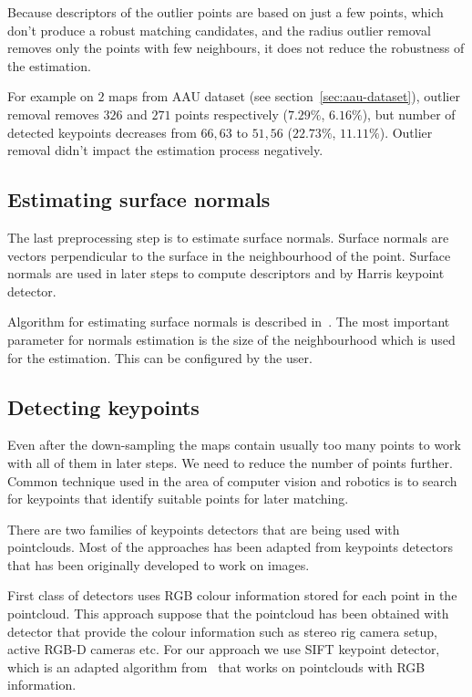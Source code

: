 Because descriptors of the outlier points are based on just a few points, which don't produce a robust matching candidates, and the radius outlier removal removes only the points with few neighbours, it does not reduce the robustness of the estimation.

For example on $2$ maps from \gls{AAU} dataset (see section~\ref{sec:aau-dataset}), outlier removal removes $326$ and $271$ points respectively ($7.29\%$, $6.16\%$), but number of detected keypoints decreases from $66, 63$ to $51, 56$ ($22.73\%$, $11.11\%$). Outlier removal didn't impact the estimation process negatively.

\subsection{Estimating surface normals}
\label{sec:normal-estimation}

The last preprocessing step is to estimate surface normals. Surface normals are vectors perpendicular to the surface in the neighbourhood of the point. Surface normals are used in later steps to compute descriptors and by Harris keypoint detector.

Algorithm for estimating surface normals is described in~\citet{RusuDoctoralDissertation}. The most important parameter for normals estimation is the size of the neighbourhood which is used for the estimation. This can be configured by the user.

\subsection{Detecting keypoints}

Even after the down-sampling the maps contain usually too many points to work with all of them in later steps. We need to reduce the number of points further. Common technique used in the area of computer vision and robotics is to search for keypoints that identify suitable points for later matching.

There are two families of keypoints detectors that are being used with pointclouds. Most of the approaches has been adapted from keypoints detectors that has been originally developed to work on images.

First class of detectors uses RGB colour information stored for each point in the pointcloud. This approach suppose that the pointcloud has been obtained with detector that provide the colour information such as stereo rig camera setup, active RGB-D cameras etc. For our approach we use \gls{SIFT} keypoint detector, which is an adapted algorithm from~\citet{lowe2004distinctive} that works on pointclouds with RGB information.

